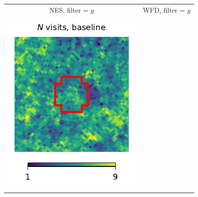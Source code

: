 \documentclass[preprintm,linenumbers]{aastex631}
\begin{document}
  	\begin{figure}
			\centering
            			\begin{tabular}{@{}c@{}c@{}}
                 NES, filter = $g$ & WFD, filter = $g$ \\
				\includegraphics{results/skymaps_cutout/skymaps_cutout_first_year_one_snap_v4_0_10yrs_db_noDD_noTwi_nside-256_CountMetric_g_NES_noDD_noTwi.pdf} &

\end{tabular}
\end{figure}
\end{document}
